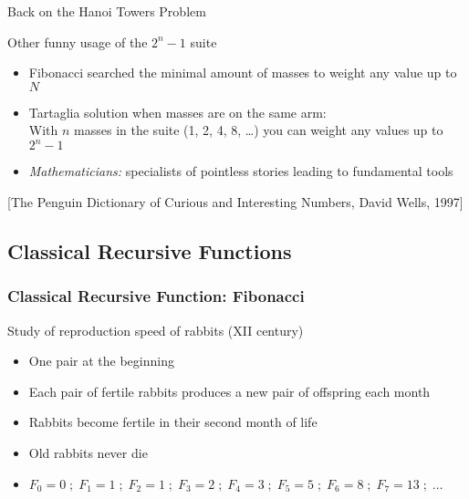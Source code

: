 \begin{Coupe}
\begin{frame}{Back on the Hanoi Towers Problem}
  \begin{block}{Other funny usage of the $2^n-1$ suite}
    \begin{itemize}
    \item Fibonacci searched the minimal amount of masses to weight any value up
      to $N$
    \item Tartaglia solution when masses are on the same arm:\\
      {\small With $n$ masses in the suite (1, 2, 4, 8, \ldots) you can weight any
        values up to $2^n-1$}
    \item \textit{Mathematicians:} specialists of pointless stories leading
      to fundamental tools 
    \end{itemize}
  \end{block}

  [The Penguin Dictionary of Curious and Interesting Numbers, David Wells, 1997]
  \medskip
\end{frame}
\subsection{Classical Recursive Functions}
\subsectionpage
\begin{frame}[fragile]\frametitle{Classical Recursive Function: Fibonacci}

  \begin{block}{Study of reproduction speed of rabbits (XII century)}
    \begin{itemize}
    \item One pair at the beginning
    \item Each pair of fertile rabbits produces a new pair of offspring each
      month
    \item Rabbits become fertile in their second month of life
    \item Old rabbits never die
    \item $F_0=0 \;;\; F_1=1 \;;\; F_2=1 \;;\; F_3=2  \;;\; F_4=3 \;;\;
           F_5=5 \;;\; F_6=8 \;;\; F_7=13 \;;\; \ldots$
    \end{itemize}
  \end{block}

  \begin{columns}
\end{columns}
\end{frame}
\end{Coupe}
